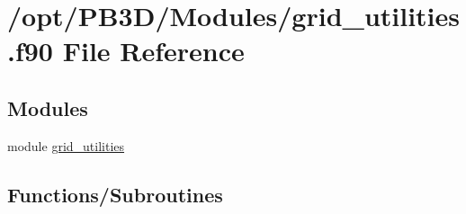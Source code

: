 \hypertarget{grid__utilities_8f90}{}\section{/opt/\+P\+B3\+D/\+Modules/grid\+\_\+utilities.f90 File Reference}
\label{grid__utilities_8f90}
\subsection*{Modules}
\begin{DoxyCompactItemize}
\item 
module \hyperlink{namespacegrid__utilities}{grid\+\_\+utilities}
\end{DoxyCompactItemize}
\subsection*{Functions/\+Subroutines}
